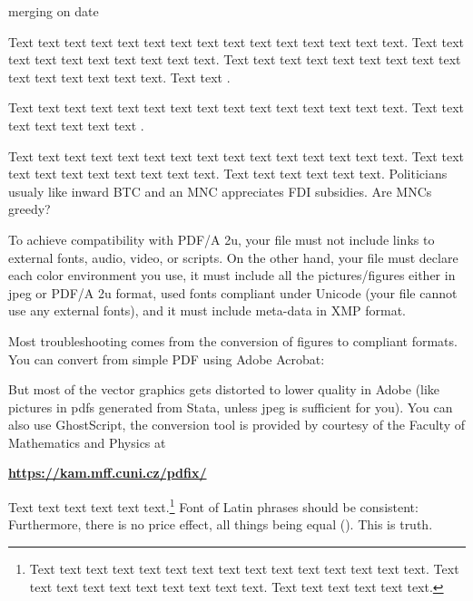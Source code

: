 merging on date




Text text text text text text text text text text text text text text text. Text text text text text text text text text text. Text text text text text text text text text text text text text text text. Text text  \citet{Haufler2006}.

Text text text text text text text text text text text text text text text. Text text text text text text text \cite[see, ,][pg.~10]{Haaparanta1996}. 



Text text text text text text text text text text text text text text text. Text text text text text text text text text text. Text text text text text text. Politicians usualy like inward \ac{BTC} and an \ac{MNC} appreciates \ac{FDI} subsidies. Are \acp{MNC} greedy?



To achieve compatibility with PDF/A 2u, your file must not include links to external fonts, audio, video, or scripts. On the other hand, your file must declare each color environment you use, it must include all the pictures/figures either in jpeg or PDF/A 2u format, used fonts compliant under Unicode (your file cannot use any external fonts), and it must include meta-data in XMP format.


Most troubleshooting comes from the conversion of figures to compliant formats. You can convert from simple PDF using Adobe Acrobat:



But most of the vector graphics gets distorted to lower quality in Adobe (like pictures in pdfs generated from Stata, unless jpeg is sufficient for you). You can also use GhostScript, the conversion tool is provided by courtesy of the Faculty of Mathematics and Physics at

\vspace{0.5cm}
\textbf{\href{https://kam.mff.cuni.cz/pdfix/}{https://kam.mff.cuni.cz/pdfix/}}
\vspace{0.5cm}

Text text text text text text.\footnote{Text text text text text text text text text text text text text text text. Text text text text text text text text text text. Text text text text text text.} Font of Latin phrases should be consistent: Furthermore, there is no  price effect, all things being equal (). This is  truth.


